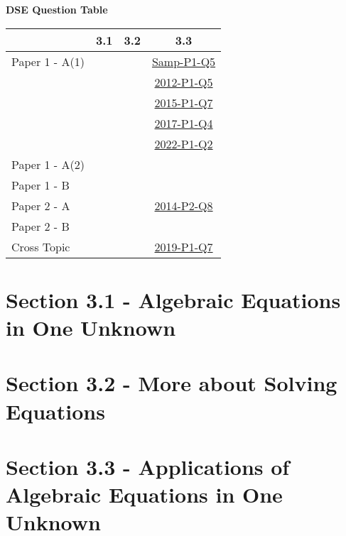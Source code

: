 \documentclass[12pt, a4paper]{article}
\begin{document}
\begin{absolutelynopagebreak}
\begin{center}
\textbf{DSE Question Table}
\end{center}
\begin{center}
\begin{tabular}{|l|c|c|c|}
\hline
        & 3.1 & 3.2 & 3.3 \\\hline
\hline
Paper 1 - A(1)&  &  & \hyperref[DSE2012S-CoreP1-Q05]{Samp-P1-Q5} \\
&  &  & \hyperref[DSE2012-CoreP1-Q05]{2012-P1-Q5} \\
&  &  & \hyperref[DSE2015-CoreP1-Q07]{2015-P1-Q7} \\
&  &  & \hyperref[DSE2017-CoreP1-Q04]{2017-P1-Q4} \\
&  &  & \hyperref[DSE2022-CoreP1-Q02]{2022-P1-Q2} \\
\hline
Paper 1 - A(2)&  &  &  \\
\hline
Paper 1 - B&  &  &  \\
\hline
\hline
Paper 2 - A&  &  & \hyperref[DSE2014-CoreP2-Q08]{2014-P2-Q8} \\
\hline
Paper 2 - B&  &  &  \\
\hline
\hline
Cross Topic&  &  & \hyperref[DSE2019-CoreP1-Q07]{2019-P1-Q7} \\
\hline
\end{tabular}
\end{center}
\end{absolutelynopagebreak}




\section*{Section 3.1 - Algebraic Equations in One Unknown}\label{section:1-3-1}





\section*{Section 3.2 - More about Solving Equations}\label{section:1-3-2}





\section*{Section 3.3 - Applications of Algebraic Equations in One Unknown}\label{section:1-3-3}
\end{document}

